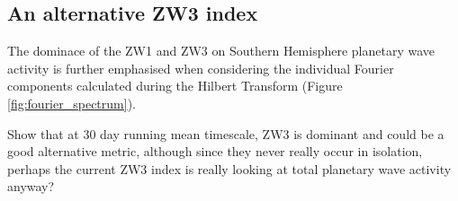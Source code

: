 \subsection{An alternative ZW3 index}

The dominace of the ZW1 and ZW3 on Southern Hemisphere planetary wave activity is further emphasised when considering the individual Fourier components calculated during the Hilbert Transform (Figure \ref{fig:fourier_spectrum}).


Show that at 30 day running mean timescale, ZW3 is dominant and could be a good alternative metric, although since they never really occur in isolation, perhaps the current ZW3 index is really looking at total planetary wave activity anyway?